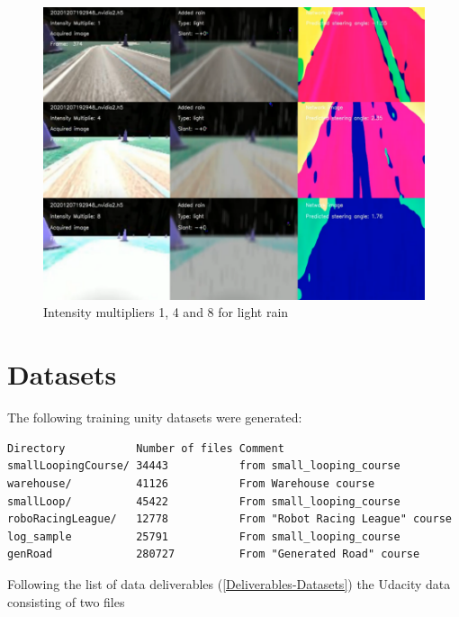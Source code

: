 \begin{figure}[ht]
 \centering 
 \includegraphics[width=\textwidth]{Figures/20201207192948_nvidia2_mult_1_4_8_light.png}
 \caption{Intensity multipliers 1, 4 and 8 for light rain}
 \label{fig:20201207192948_nvidia2_mult_1_4_8_light}
\end{figure}

\section{Datasets}

The following training unity datasets were generated:
\begin{verbatim}
Directory           Number of files Comment
smallLoopingCourse/ 34443           from small_looping_course
warehouse/          41126           From Warehouse course
smallLoop/          45422           From small_looping_course
roboRacingLeague/   12778           From "Robot Racing League" course
log_sample          25791           From small_looping_course
genRoad             280727          From "Generated Road" course
\end{verbatim}


Following the list of data deliverables (\ref{Deliverables-Datasets}) the Udacity data consisting of two files 



